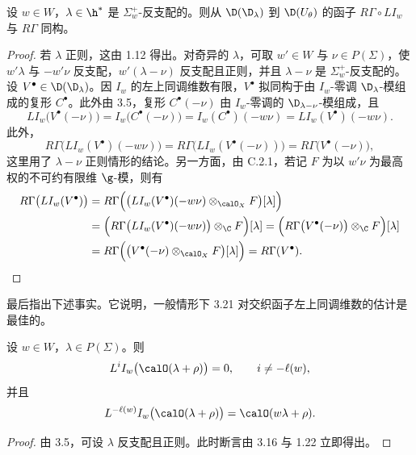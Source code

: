\begin{theorem}\label{thm:03.3.23}
设 $w\in W$，$\lambda\in\h^*$ 是 $\Sigma^+_w$-反支配的。则从 $\D(\D_\lambda)$ 到 $\D(U_\theta)$ 的函子 $R\Gamma\circ LI_w$ 与 $R\Gamma$ 同构。
\end{theorem}

\begin{proof}
若 $\lambda$ 正则，这由 1.12 得出。对奇异的 $\lambda$，可取 $w'\in W$ 与 $\nu\in P(\Sigma)$，使 $w'\lambda$ 与 $-w'\nu$ 反支配，$w'(\lambda-\nu)$ 反支配且正则，并且 $\lambda-\nu$ 是 $\Sigma^+_w$-反支配的。设 $V^\bullet\in\D(\D_\lambda)$。因 $I_w$ 的左上同调维数有限，$V^\bullet$ 拟同构于由 $I_w$-零调 $\D_\lambda$-模组成的复形 $C^\bullet$。此外由 3.5，复形 $C^\bullet(-\nu)$ 由 $I_w$-零调的 $\D_{\lambda-\nu}$-模组成，且
$$LI_w\bigl(V^\bullet(-\nu)\bigr)=I_w\bigl(C^\bullet(-\nu)\bigr)=I_w(C^\bullet)(-w\nu)=LI_w(V^\bullet)(-w\nu).$$
此外，
$$R\Gamma\bigl(LI_w(V^\bullet)(-w\nu)\bigr)=R\Gamma\bigl(LI_w(V^\bullet(-\nu))\bigr)=R\Gamma\bigl(V^\bullet(-\nu)\bigr),$$
这里用了 $\lambda-\nu$ 正则情形的结论。另一方面，由 C.2.1，若记 $F$ 为以 $w'\nu$ 为最高权的不可约有限维 $\g$-模，则有
{\small
\begin{align*}
R\Gamma\bigl(LI_w(V^\bullet)\bigr)
&=R\Gamma\Bigl(\bigl(LI_w(V^\bullet)(-w\nu)\otimes_{\calO_X}F\bigr)[\lambda]\Bigr)\\
&=\Bigl(R\Gamma\bigl(LI_w(V^\bullet)(-w\nu)\bigr)\otimes_\C F\Bigr)[\lambda]
=\Bigl(R\Gamma\bigl(V^\bullet(-\nu)\bigr)\otimes_\C F\Bigr)[\lambda]\\
&=R\Gamma\Bigl(\bigl(V^\bullet(-\nu)\otimes_{\calO_X}F\bigr)[\lambda]\Bigr)=R\Gamma(V^\bullet).
\end{align*}}
\end{proof}

最后指出下述事实。它说明，一般情形下 3.21 对交织函子左上同调维数的估计是最佳的。

\begin{proposition}\label{prop:03.3.24}
设 $w\in W$，$\lambda\in P(\Sigma)$。则
$$L^iI_w\bigl(\calO(\lambda+\rho)\bigr)=0,\qquad i\neq-\ell(w),$$
并且
$$L^{-\ell(w)}I_w\bigl(\calO(\lambda+\rho)\bigr)=\calO(w\lambda+\rho).$$
\end{proposition}

\begin{proof}
由 3.5，可设 $\lambda$ 反支配且正则。此时断言由 3.16 与 1.22 立即得出。
\end{proof}
